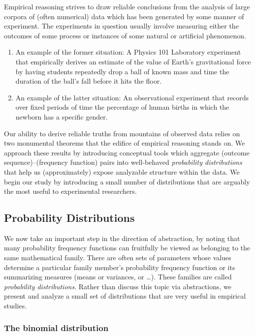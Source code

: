 \bigskip

Empirical reasoning strives to draw reliable conclusions from the analysis of large corpora of (often numerical) data which has been generated by some manner of experiment.  The experiments in question usually involve measuring either the outcomes of some process or instances of some natural or artificial phenomenon.
\begin{enumerate}
\item
An example of the former situation:  A Physics 101 Laboratory experiment that empirically derives an estimate of the value of Earth's gravitational force by having students repeatedly drop a ball of known mass and time the duration of the ball's fall before it hits the floor.

\item
An example of the latter situation:  An observational experiment that records over fixed periods of time the percentage of human births in which the newborn has a specific gender.
\end{enumerate}

Our ability to derive reliable truths from mountains of observed data relies on two monumental theorems that the edifice of empirical reasoning stands on.  We approach these results by introducing conceptual tools which aggregate (outcome sequence)--(frequency function) pairs into well-behaved {\it probability distributions} that help us (approximately) expose analyzable structure within the data.  We begin our study by introducing a small number of distributions that are arguably the most useful to experimental researchers.

\subsection{Probability Distributions}
\label{sec:prob-distr}

We now take an important step in the direction of abstraction, by noting that many probability frequency functions can fruitfully be viewed as belonging to the same mathematical family.  There are often sets of parameters whose values determine a particular family member's probability frequency function or its summarizing measures (means or variances, or \ldots).  These families are called {\em probability distributions}.  Rather than discuss this topic via abstractions, we present and analyze a small set of distributions that are very useful in empirical studies.

\subsubsection{The binomial distribution}
\label{sec:binomial-distribution}

